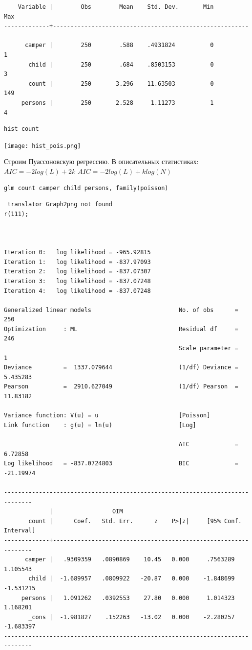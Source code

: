 \documentclass[]{book}
\begin{document}
\begin{verbatim}
    Variable |        Obs        Mean    Std. Dev.       Min        Max
-------------+---------------------------------------------------------
      camper |        250        .588    .4931824          0          1
       child |        250        .684    .8503153          0          3
       count |        250       3.296    11.63503          0        149
     persons |        250       2.528     1.11273          1          4
\end{verbatim}

\begin{verbatim}
hist count
\end{verbatim}

\texttt{[image: hist\_pois.png]}

Строим Пуассоновскую регрессию.
В описательных статистиках:
\(AIC = -2log(L) + 2k\)
\(AIC = -2log(L) + klog(N)\)

\begin{verbatim}
glm count camper child persons, family(poisson)
\end{verbatim}

\begin{verbatim}
 translator Graph2png not found
r(111);



Iteration 0:   log likelihood = -965.92815  
Iteration 1:   log likelihood = -837.97093  
Iteration 2:   log likelihood = -837.07307  
Iteration 3:   log likelihood = -837.07248  
Iteration 4:   log likelihood = -837.07248  

Generalized linear models                         No. of obs      =        250
Optimization     : ML                             Residual df     =        246
                                                  Scale parameter =          1
Deviance         =  1337.079644                   (1/df) Deviance =   5.435283
Pearson          =  2910.627049                   (1/df) Pearson  =   11.83182

Variance function: V(u) = u                       [Poisson]
Link function    : g(u) = ln(u)                   [Log]

                                                  AIC             =    6.72858
Log likelihood   = -837.0724803                   BIC             =  -21.19974

------------------------------------------------------------------------------
             |                 OIM
       count |      Coef.   Std. Err.      z    P>|z|     [95% Conf. Interval]
-------------+----------------------------------------------------------------
      camper |   .9309359   .0890869    10.45   0.000     .7563289    1.105543
       child |  -1.689957   .0809922   -20.87   0.000    -1.848699   -1.531215
     persons |   1.091262   .0392553    27.80   0.000     1.014323    1.168201
       _cons |  -1.981827    .152263   -13.02   0.000    -2.280257   -1.683397
------------------------------------------------------------------------------
\end{verbatim}
\end{document}
